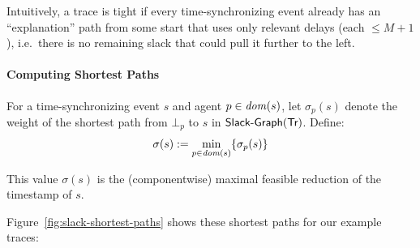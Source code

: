 Intuitively, a trace is tight if every time-synchronizing event already has an ``explanation'' path from some start that uses only relevant delays (each $\le M{+}1$), i.e.\ there is no remaining slack that could pull it further to the left.

\paragraph*{Computing Shortest Paths}

For a time-synchronizing event $s$ and agent $p \in \mathit{dom}(s)$, let $\sigma_p(s)$ denote the weight of the shortest path from $\bot_p$ to $s$ in $\mathrm{\textsf{Slack-Graph}}(\textsf{Tr})$. Define:
\[
\sigma(s) := \min_{p \in \mathit{dom}(s)} \{\sigma_p(s)\}
\]

This value $\sigma(s)$ is the (componentwise) maximal feasible reduction of the timestamp of $s$.

Figure~\ref{fig:slack-shortest-paths} shows these shortest paths for our example traces:

